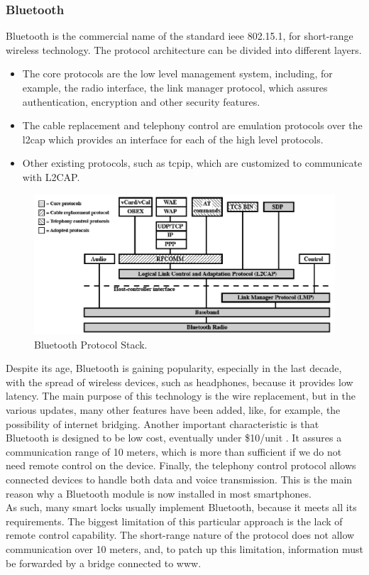 \subsubsection{Bluetooth}
Bluetooth is the commercial name of the standard \acrshort{ieee} 802.15.1, for short-range wireless technology. The protocol architecture can be divided into different layers. 
\begin{itemize}
    \item The core protocols are the low level management system, including, for example, the radio interface, the link manager protocol, which assures authentication, encryption and other security features.
    \item The cable replacement and telephony control are emulation protocols over the \gls{l2cap} which provides an interface for each of the high level protocols. 
    \item Other existing protocols, such as \acrshort{tcpip}, which are customized to communicate with L2CAP. 
\end{itemize}
\begin{figure}[ht]
    \centering
    \includegraphics[width=\textwidth]{figures/bluetooth-arch.png}
    \caption{Bluetooth Protocol Stack.}
    \label{fig:blueetooth}
\end{figure}
Despite its age, Bluetooth is gaining popularity, especially in the last decade, with the spread of wireless devices, such as headphones, because it provides low latency. The main purpose of this technology is the wire replacement, but in the various updates, many other features have been added, like, for example, the possibility of internet bridging. Another important characteristic is that Bluetooth is designed to be low cost, eventually under \$10/unit \cite{1007414}. It assures a communication range of 10 meters, which is more than sufficient if we do not need remote control on the device. Finally, the telephony control protocol allows connected devices to handle both data and voice transmission. This is the main reason why a Bluetooth module is now installed in most smartphones.
\\ As such, many smart locks usually implement Bluetooth, because it meets all its requirements. The biggest limitation of this particular approach is the lack of remote control capability. The short-range nature of the protocol does not allow communication over 10 meters, and, to patch up this limitation, information must be forwarded by a bridge connected to \acrlong{www}.

